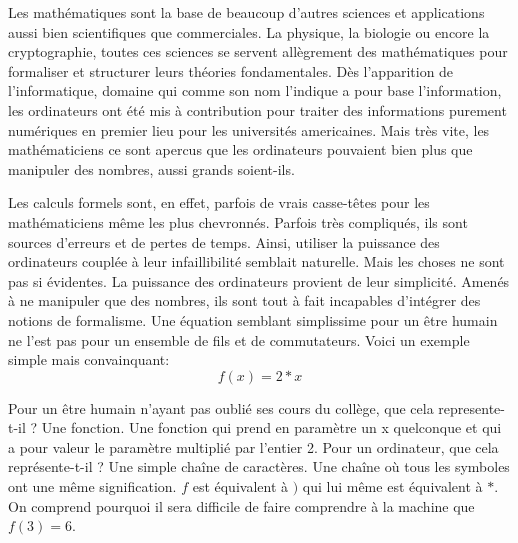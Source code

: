\documentclass[french,12pt]{report}
\begin{document}
Les  math\'ematiques sont  la base  de beaucoup  d'autres  sciences et
applications aussi  bien scientifiques que  commerciales. La physique,
la biologie ou encore la cryptographie, toutes ces sciences se servent
all\`egrement des math\'ematiques  pour formaliser et structurer leurs
th\'eories   fondamentales.  D\`es  l'apparition   de  l'informatique,
domaine qui  comme son  nom l'indique a  pour base  l'information, les
ordinateurs  ont  \'et\'e  mis   \`a  contribution  pour  traiter  des
informations   purement  num\'eriques   en  premier   lieu   pour  les
universit\'es americaines.  Mais  tr\`es vite, les math\'ematiciens ce
sont apercus que les ordinateurs pouvaient bien plus que manipuler des
nombres, aussi grands soient-ils.

Les  calculs formels sont,  en effet,  parfois de  vrais casse-t\^etes
pour les math\'ematiciens m\^eme les plus chevronn\'es. Parfois tr\`es
compliqu\'es, ils sont sources d'erreurs et de pertes de temps. Ainsi,
utiliser   la   puissance   des   ordinateurs   coupl\'ee   \`a   leur
infaillibilit\'e semblait  naturelle.  Mais les choses ne  sont pas si
\'evidentes.   La   puissance  des   ordinateurs   provient  de   leur
simplicit\'e. Amen\'es \`a ne manipuler que des nombres, ils sont tout
\`a  fait  incapables  d'int\'egrer  des notions  de  formalisme.  Une
\'equation  semblant simplissime pour  un \^etre  humain ne  l'est pas
pour un ensemble  de fils et de commutateurs.  Voici un exemple simple
mais convainquant:
$$ f(x) = 2 * x $$

Pour un \^etre humain n'ayant pas oubli\'e ses cours du coll\`ege, que
cela  represente-t-il  ?  Une  fonction.  Une fonction  qui  prend  en
param\`etre  un x  quelconque  et  qui a  pour  valeur le  param\`etre
multipli\'e   par  l'entier   2.    Pour  un   ordinateur,  que   cela
repr\'esente-t-il ? Une simple  cha\^ine de caract\`eres. Une cha\^ine
o\`u  tous  les  symboles  ont  une  m\^eme  signification.   $f$  est
\'equivalent  \`a $)$  qui lui  m\^eme  est \'equivalent  \`a $*$.  On
comprend pourquoi il sera difficile de faire comprendre \`a la machine
que $ f(3) = 6 $.
\end{document}
